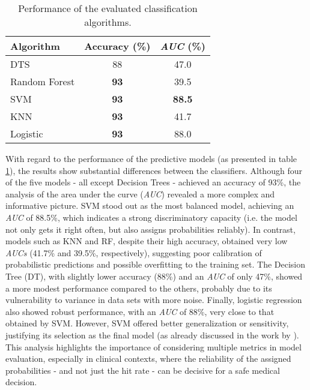 \begin{table}[H]
  \centering
  \caption{Performance of the evaluated classification algorithms.}
  \label{tab:performance_azari}
  \begin{tabular}{|l|c|c|}
    \hline
    \textbf{Algorithm} & \textbf{Accuracy (\%)} & \textbf{\textit{AUC} (\%)} \\
    \hline
    DTS                & 88                     & 47.0                       \\
    Random Forest      & \textbf{93}            & 39.5                       \\
    SVM                & \textbf{93}            & \textbf{88.5}              \\
    KNN                & \textbf{93}            & 41.7                       \\
    Logistic           & \textbf{93}            & 88.0                       \\
    \hline
  \end{tabular}
\end{table}

With regard to the performance of the predictive models (as presented in table
\ref{tab:performance_azari}), the results show substantial differences between
the classifiers. Although four of the five models - all except Decision Trees -
achieved an accuracy of 93\%, the analysis of the area under the curve
(\textit{AUC}) revealed a more complex and informative picture. SVM stood out
as the most balanced model, achieving an \textit{AUC} of 88.5\%, which
indicates a strong discriminatory capacity (i.e. the model not only gets it
right often, but also assigns probabilities reliably). In contrast, models such
as KNN and RF, despite their high accuracy, obtained very low \textit{AUCs}
(41.7\% and 39.5\%, respectively), suggesting poor calibration of probabilistic
predictions and possible overfitting to the training set. The Decision Tree
(DT), with slightly lower accuracy (88\%) and an \textit{AUC} of only 47\%,
showed a more modest performance compared to the others, probably due to its
vulnerability to variance in data sets with more noise. Finally, logistic
regression also showed robust performance, with an \textit{AUC} of 88\%, very
close to that obtained by SVM. However, SVM offered better generalization or
sensitivity, justifying its selection as the final model (as already discussed
in the work by \textcite{bca_subtypes_with_ml_Wu_2021}). This analysis
highlights the importance of considering multiple metrics in model evaluation,
especially in clinical contexts, where the reliability of the assigned
probabilities - and not just the hit rate - can be decisive for a safe medical
decision.

